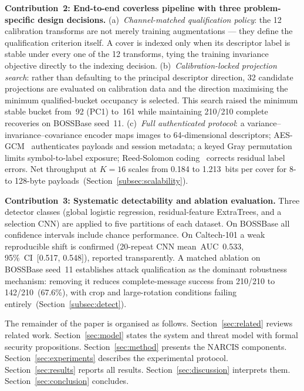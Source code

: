\documentclass[10pt,journal]{IEEEtran}
\newcommand{\method}{NARCIS\xspace}
\begin{document}
\textbf{Contribution~2: End-to-end coverless pipeline with three
problem-specific design decisions.}
(a)~\emph{Channel-matched qualification policy}: the 12 calibration
transforms are not merely training augmentations — they define the
qualification criterion itself. A cover is indexed only when its
descriptor label is stable under every one of the 12 transforms,
tying the training invariance objective directly to the indexing
decision.
(b)~\emph{Calibration-locked projection search}: rather than defaulting
to the principal descriptor direction, 32 candidate projections are
evaluated on calibration data and the direction maximising the minimum
qualified-bucket occupancy is selected. This search raised the minimum
stable bucket from~92 (PC1) to~161 while maintaining 210/210 complete
recoveries on BOSSBase seed~11.
(c)~\emph{Full authenticated protocol}: a variance--invariance--covariance
encoder maps images to 64-dimensional descriptors; AES-GCM~\cite{nist2007gcm}
authenticates payloads and session metadata; a keyed Gray permutation
limits symbol-to-label exposure; Reed-Solomon
coding~\cite{reed1960polynomial} corrects residual label errors.
Net throughput at $K{=}16$ scales from 0.184 to 1.213~bits per cover
for 8- to 128-byte payloads~(Section~\ref{subsec:scalability}).

\textbf{Contribution~3: Systematic detectability and ablation
evaluation.} Three detector classes (global logistic regression,
residual-feature ExtraTrees, and a selection CNN) are applied to five
partitions of each dataset. On BOSSBase all confidence intervals include
chance performance. On Caltech-101 a weak reproducible shift is
confirmed (20-repeat CNN mean~AUC~0.533, 95\%~CI~[0.517, 0.548]),
reported transparently. A matched ablation on BOSSBase seed~11
establishes attack qualification as the dominant robustness mechanism:
removing it reduces complete-message success from 210/210 to
142/210~(67.6\%), with crop and large-rotation conditions failing
entirely~(Section~\ref{subsec:detect}).

The remainder of the paper is organised as follows. Section~\ref{sec:related}
reviews related work. Section~\ref{sec:model} states the system and threat
model with formal security propositions. Section~\ref{sec:method}
presents the \method components. Section~\ref{sec:experiments} describes
the experimental protocol. Section~\ref{sec:results} reports all results.
Section~\ref{sec:discussion} interprets them. Section~\ref{sec:conclusion}
concludes.

\end{document}
